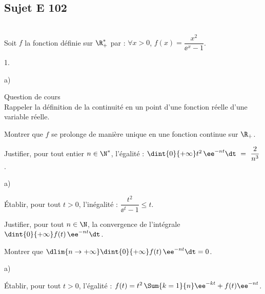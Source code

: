 \documentclass[11pt]{article}%
\begin{document}
\newpage



\subsection*{Sujet E 102}


\begin{exerciceAP}~\\
  Soit $f$ la fonction définie sur $\R_+^*$ par : $\forall x>0$, 
  $f(x) = \dfrac{x^2}{\ee^x -1}$.
  \begin{noliste}{1.}
    \setlength{\itemsep}{2mm}
    \item 
    \begin{noliste}{a)}
    \setlength{\itemsep}{2mm}
      \item Question de cours\\
      Rappeler la définition de la continuité en un point d'une fonction
      réelle d'une variable réelle.
      
      \item Montrer que $f$ se prolonge de manière unique en une 
      fonction continue sur $\R_+$.
    \end{noliste}
    
  \item Justifier, pour tout entier $n\in \N^*$, l'égalité :
    $\dint{0}{+\infty} t^2 \, \ee^{-nt} \dt \ = \ \dfrac{2}{n^3}$.
    
    \item 
    \begin{noliste}{a)}
    \setlength{\itemsep}{2mm}
      \item Établir, pour tout $t>0$, l'inégalité : $\dfrac{t^2}
      {\ee^t -1} \leq t$.
      
      \item Justifier, pour tout $n\in \N$, la convergence de 
      l'intégrale $\dint{0}{+\infty} f(t) \, \ee^{-nt} \dt$.
      
      \item Montrer que $\dlim{n\to +\infty} \dint{0}{+\infty}
      f(t) \, \ee^{-nt} \dt = 0$.
    \end{noliste}
    
    \item 
    \begin{noliste}{a)}
    \setlength{\itemsep}{2mm}
      \item Établir, pour tout $t>0$, l'égalité : $f(t) = t^2 \, 
      \Sum{k=1}{n} \ee^{-kt} + f(t) \ee^{-nt}$.
      

\end{noliste}
\end{noliste}
\end{exerciceAP}
\end{document}
